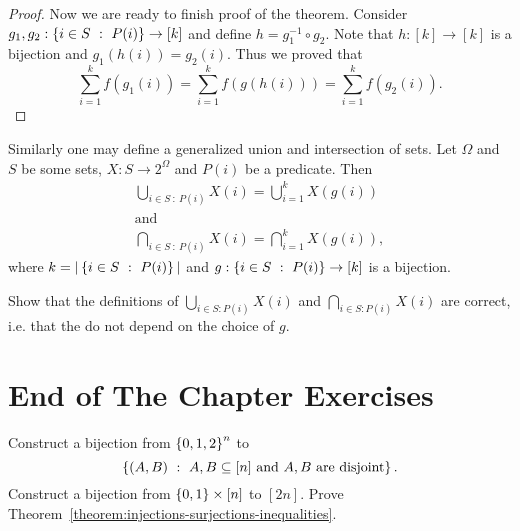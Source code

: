 \begin{proof}
  Now we are ready to finish proof of the theorem.
  Consider $g_1, g_2 : \set[P(i)]{i \in S} \to [k]$ and define
  $h = g_1^{-1} \circ g_2$. Note that $h : [k] \to [k]$ is a bijection and
  $g_1(h(i)) = g_2(i)$. Thus we proved that
  \[
    \sum_{i = 1}^k f(g_1(i)) = \sum_{i = 1}^k f(g(h(i))) =
    \sum_{i = 1}^k f(g_2(i)).
  \]
\end{proof}

Similarly one may define a generalized union and intersection of sets.
Let $\Omega$ and $S$ be some sets, $X : S \to 2^\Omega$ and $P(i)$ be a
predicate. Then
\begin{gather*}
  \bigcup_{i \in S ~:~ P(i)} X(i) = \bigcup_{i = 1}^k X(g(i)) \\
  \text{and}\\
  \bigcap_{i \in S ~:~ P(i)} X(i) = \bigcap_{i = 1}^k X(g(i)),
\end{gather*}
where $k = |\set[P(i)]{i \in S}|$ and $g : \set[P(i)]{i \in S} \to [k]$ is a
bijection.

\begin{exercise}
  Show that the definitions of $\bigcup_{i \in S : P(i)} X(i)$ and
  $\bigcap_{i \in S : P(i)} X(i)$ are correct,
  i.e. that the do not depend on the choice of $g$.
\end{exercise}

\section*{End of The Chapter Exercises}
\begin{exercises}
  \exercise Construct a bijection from $\set{0, 1, 2}^n$ to
    \[
      \set[{A, B \subseteq [n] \text{ and } A, B \text{ are disjoint}}]{(A, B)}.
    \]
  \exercise Construct a bijection from $\set{0, 1} \times [n]$ to $[2n]$.
  \exercise Prove Theorem~\ref{theorem:injections-surjections-inequalities}.
\end{exercises}
